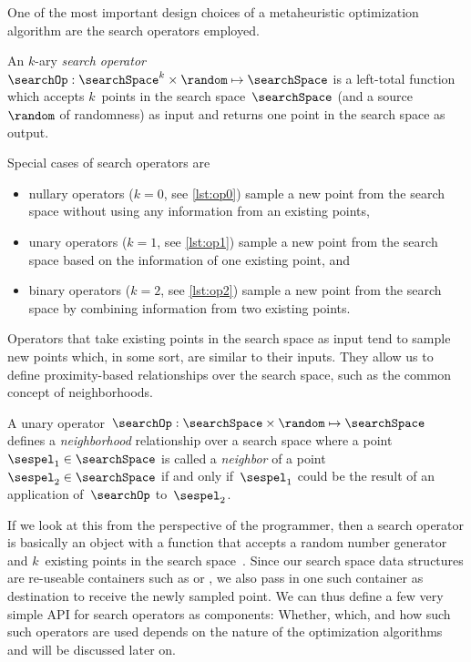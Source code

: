 %
\label{sec:searchOperators}%
%
One of the most important design choices of a metaheuristic optimization algorithm are the search operators employed.%
%
%
%
\begin{definition}%
\label{def:searchOp}%
An $k$-ary \emph{search operator}~$\searchOp:\searchSpace^k\times\random\mapsto\searchSpace$ is a left-total function which accepts $k$~points in the search space~$\searchSpace$ (and a source~$\random$ of randomness) as input and returns one point in the search space as output.%
\end{definition}%
%
Special cases of search operators are%
%
\begin{itemize}%
\item nullary operators ($k=0$, see \cref{lst:op0}) sample a new point from the search space without using any information from an existing points,%
\item unary operators ($k=1$, see \cref{lst:op1}) sample a new point from the search space based on the information of one existing point, and%
\item binary operators ($k=2$, see \cref{lst:op2}) sample a new point from the search space by combining information from two existing points.%
\end{itemize}%
%
Operators that take existing points in the search space as input tend to sample new points which, in some sort, are similar to their inputs.
They allow us to define proximity-based relationships over the search space, such as the common concept of neighborhoods.

\begin{definition}[Neighborhood]
A unary operator~$\searchOp:\searchSpace\times\random\mapsto\searchSpace$ defines a \emph{neighborhood} relationship over a search space where a point~$\sespel_1\in\searchSpace$ is called a \emph{neighbor} of a point~$\sespel_2\in\searchSpace$ if and only if~$\sespel_1$ could be the result of an application of~$\searchOp$ to~$\sespel_2$.%
\end{definition}%
%
\endhsection%
%
%
%
If we look at this from the perspective of the programmer, then a search operator is basically an object with a function that accepts a random number generator and $k$~existing points in the search space~\searchSpace.
Since our search space data structures are re-useable containers such as  or \numpyndarrays, we also pass in one such container as destination to receive the newly sampled point.
We can thus define a few very simple API for search operators as components:%
%
%
%
%
%
%
%
Whether, which, and how such such operators are used depends on the nature of the optimization algorithms and will be discussed later on.

